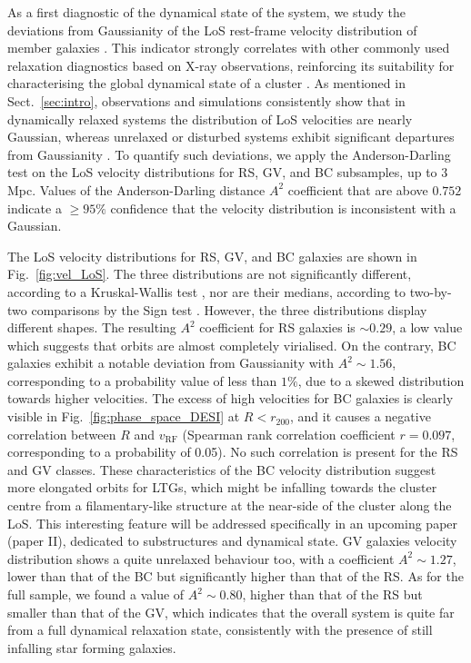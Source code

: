 \documentclass{aa}
\begin{document}
As a first diagnostic of the dynamical state of the system, we study the deviations from Gaussianity of the LoS rest-frame velocity distribution of member galaxies \citep{Pizzuti_2020}. This indicator strongly correlates with other commonly used relaxation diagnostics based on X-ray observations, reinforcing its suitability for characterising the global dynamical state of a cluster \citep{Roberts_2018}. As mentioned in Sect.~\ref{sec:intro}, observations and simulations consistently show that in dynamically relaxed systems the distribution of LoS velocities are nearly Gaussian, whereas unrelaxed or disturbed systems exhibit significant departures from Gaussianity \citep{Yahil_1977, Boselli_2006, Ribeiro_2013}. To quantify such deviations, we apply the Anderson-Darling test \citep{Anderson_1952} on the LoS velocity distributions for RS, GV, and BC 
subsamples, up to $3$ Mpc. Values of the Anderson-Darling distance $A^2$ coefficient that are above $0.752$ indicate a $\geq 95\% $ confidence that the velocity distribution is inconsistent with a Gaussian.

The LoS velocity distributions for RS, GV, and BC
galaxies are shown in Fig.~\ref{fig:vel_LoS}. The three distributions are not significantly different, according to a Kruskal-Wallis test \citep{KW52}, nor are their medians, according to two-by-two comparisons by the Sign test \citep{DM46}. However, the three distributions display different shapes.
The resulting $A^2$ coefficient for RS galaxies is $\sim0.29$, a low value which suggests that orbits are almost completely virialised. On the contrary, BC galaxies exhibit a notable deviation from Gaussianity with $A^2 \sim 1.56$, corresponding to a probability value of less than $1 \%$, due to a skewed distribution towards higher velocities. The excess of high velocities for BC galaxies is clearly visible in Fig.~\ref{fig:phase_space_DESI} at $R<r_{200}$, and it causes a
negative correlation between $R$ and $v_\text{RF}$ (Spearman rank correlation coefficient $r=0.097$, corresponding to a probability of 0.05). No such correlation is present for the RS and GV classes. These characteristics of the BC velocity distribution suggest more elongated orbits for LTGs, which might be infalling towards the cluster centre from a filamentary-like structure at the near-side of the cluster along the LoS. This interesting feature will be addressed specifically in an upcoming paper (paper II), dedicated to substructures and dynamical state.
GV galaxies velocity distribution shows a quite unrelaxed behaviour too, with a coefficient $A^2 \sim 1.27$, lower than that of the BC but significantly higher than that of the RS. As for the full sample, we found a value of $A^2 \sim 0.80$, higher than that of the RS but smaller than that of the GV, which indicates that the overall system is quite far from a full dynamical relaxation state, consistently with the presence of still infalling star forming galaxies.
\end{document}
